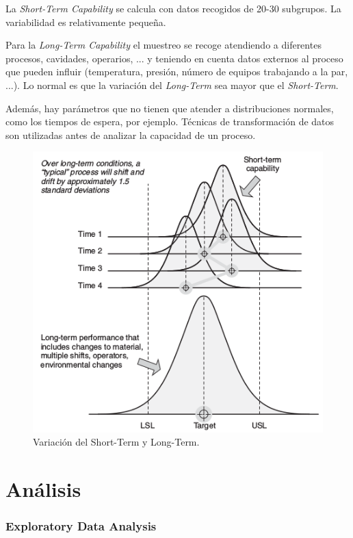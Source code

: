\documentclass[]{article}
\begin{document}
La \textit{Short-Term Capability} se calcula con datos recogidos de 20-30 subgrupos. La variabilidad es relativamente pequeña.

Para la \textit{Long-Term Capability} el muestreo se recoge atendiendo a diferentes procesos, cavidades, operarios, ... y teniendo en cuenta datos externos al proceso que pueden influir (temperatura, presión, número de equipos trabajando a la par, ...). Lo normal es que la variación del \textit{Long-Term} sea mayor que el \textit{Short-Term}.

Además, hay parámetros que no tienen que atender a distribuciones normales, como los tiempos de espera, por ejemplo. Técnicas de transformación de datos son utilizadas antes de analizar la capacidad de un proceso.

\begin{figure}[H]
	\centering
	\includegraphics[width=120mm]{imagenes/ShortTermVsLongTerm.png}
	\caption{Variación del Short-Term y Long-Term.}
	\label{fig:ShortTermVsLongTerm}
\end{figure}

\part{Análisis}

\section{Exploratory Data Analysis}
\end{document}

